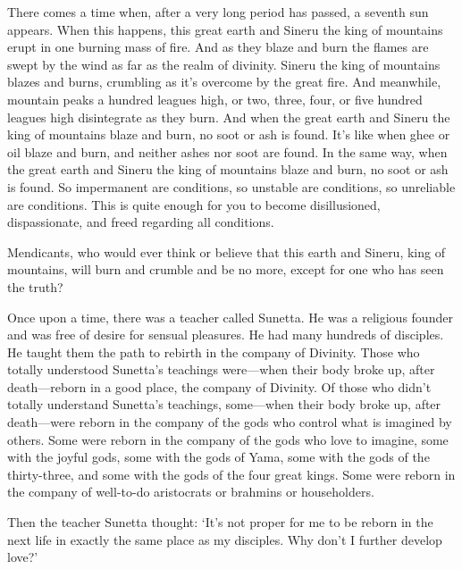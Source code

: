 \documentclass[12pt,openany]{book}%
\begin{document}
There comes a time when, after a very long period has passed, a seventh sun appears. When this happens, this great earth and Sineru the king of mountains erupt in one burning mass of fire. And as they blaze and burn the flames are swept by the wind as far as the realm of divinity. Sineru the king of mountains blazes and burns, crumbling as it’s overcome by the great fire. And meanwhile, mountain peaks a hundred leagues high, or two, three, four, or five hundred leagues high disintegrate as they burn. And when the great earth and Sineru the king of mountains blaze and burn, no soot or ash is found. It’s like when ghee or oil blaze and burn, and neither ashes nor soot are found. In the same way, when the great earth and Sineru the king of mountains blaze and burn, no soot or ash is found. So impermanent are conditions, so unstable are conditions, so unreliable are conditions. This is quite enough for you to become disillusioned, dispassionate, and freed regarding all conditions. 

Mendicants, who would ever think or believe that this earth and Sineru, king of mountains, will burn and crumble and be no more, except for one who has seen the truth? 

Once upon a time, there was a teacher called Sunetta. He was a religious founder and was free of desire for sensual pleasures. He had many hundreds of disciples. He taught them the path to rebirth in the company of Divinity. Those who totally understood Sunetta’s teachings were—when their body broke up, after death—reborn in a good place, the company of Divinity. Of those who didn’t totally understand Sunetta’s teachings, some—when their body broke up, after death—were reborn in the company of the gods who control what is imagined by others. Some were reborn in the company of the gods who love to imagine, some with the joyful gods, some with the gods of Yama, some with the gods of the thirty-three, and some with the gods of the four great kings. Some were reborn in the company of well-to-do aristocrats or brahmins or householders. 

Then the teacher Sunetta thought: ‘It’s not proper for me to be reborn in the next life in exactly the same place as my disciples. Why don’t I further develop love?’ 
\end{document}
